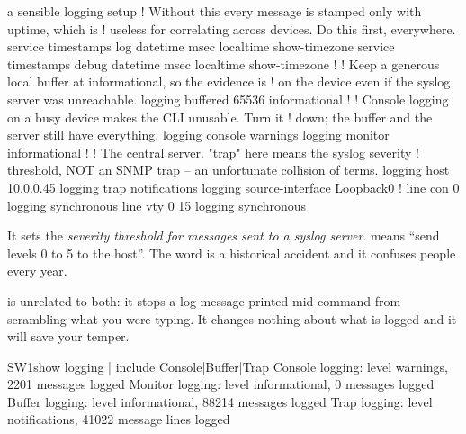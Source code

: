 \begin{config}{a sensible logging setup}
! Without this every message is stamped only with uptime, which is
! useless for correlating across devices. Do this first, everywhere.
service timestamps log datetime msec localtime show-timezone
service timestamps debug datetime msec localtime show-timezone
!
! Keep a generous local buffer at informational, so the evidence is
! on the device even if the syslog server was unreachable.
logging buffered 65536 informational
!
! Console logging on a busy device makes the CLI unusable. Turn it
! down; the buffer and the server still have everything.
logging console warnings
logging monitor informational
!
! The central server. "trap" here means the syslog severity
! threshold, NOT an SNMP trap -- an unfortunate collision of terms.
logging host 10.0.0.45
logging trap notifications
logging source-interface Loopback0
!
line con 0
 logging synchronous
line vty 0 15
 logging synchronous
\end{config}

\begin{alertbox}
It sets the \emph{severity threshold for messages sent to a syslog server}.
 means ``send levels 0 to 5 to the host''. The
word is a historical accident and it confuses people every year.

 is unrelated to both: it stops a log message printed
mid-command from scrambling what you were typing. It changes nothing about what
is logged and it will save your temper.
\end{alertbox}

\begin{verify}{SW1}{show logging | include Console|Buffer|Trap}
    Console logging: level warnings, 2201 messages logged
    Monitor logging: level informational, 0 messages logged
    Buffer logging:  level informational, 88214 messages logged
    Trap logging: level notifications, 41022 message lines logged
\end{verify}


